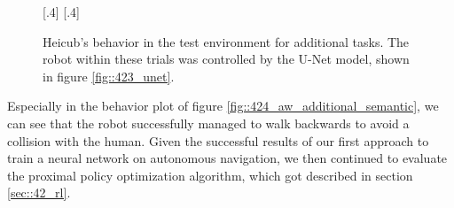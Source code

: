 \begin{figure}[h!]
	\centering
	[.4\linewidth]{}
	[.4\linewidth]{}
	\caption{Heicub's behavior in the test environment for additional tasks. The robot within these trials was controlled by the U-Net model, shown in figure \ref{fig::423_unet}.}
\label{fig::424_aw_gif_additional}
\end{figure} 
Especially in the behavior plot of figure \ref{fig::424_aw_additional_semantic}, we can see that the robot successfully managed to walk backwards to avoid a collision with the human. Given the successful results of our first approach to train a neural network on autonomous navigation, we then continued to evaluate the proximal policy optimization algorithm, which got described in section \ref{sec::42_rl}.
